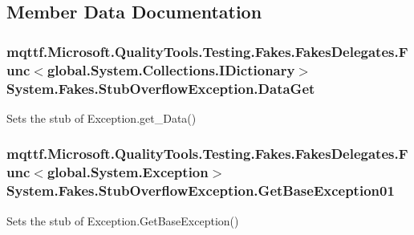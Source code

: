 \subsection{Member Data Documentation}
\hypertarget{class_system_1_1_fakes_1_1_stub_overflow_exception_afc12edf097ee7eac2a6d06adcc3ba4cc}{
\subsubsection[{Data\-Get}]{\setlength{\rightskip}{0pt plus 5cm}mqttf.\-Microsoft.\-Quality\-Tools.\-Testing.\-Fakes.\-Fakes\-Delegates.\-Func$<$global.\-System.\-Collections.\-I\-Dictionary$>$ System.\-Fakes.\-Stub\-Overflow\-Exception.\-Data\-Get}}\label{class_system_1_1_fakes_1_1_stub_overflow_exception_afc12edf097ee7eac2a6d06adcc3ba4cc}


Sets the stub of Exception.\-get\-\_\-\-Data()

\hypertarget{class_system_1_1_fakes_1_1_stub_overflow_exception_a25b638264311157da7a8aeb364504af6}{
\subsubsection[{Get\-Base\-Exception01}]{\setlength{\rightskip}{0pt plus 5cm}mqttf.\-Microsoft.\-Quality\-Tools.\-Testing.\-Fakes.\-Fakes\-Delegates.\-Func$<$global.\-System.\-Exception$>$ System.\-Fakes.\-Stub\-Overflow\-Exception.\-Get\-Base\-Exception01}}\label{class_system_1_1_fakes_1_1_stub_overflow_exception_a25b638264311157da7a8aeb364504af6}


Sets the stub of Exception.\-Get\-Base\-Exception()

